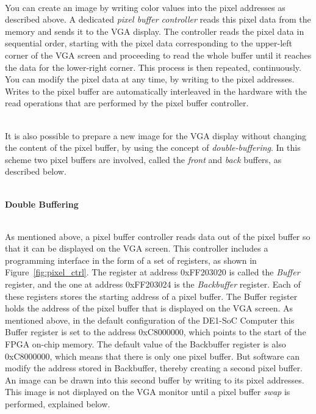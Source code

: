 \documentclass[epsfig,10pt,fullpage]{article}
\begin{document}
~\\
\noindent
You can create an image by writing color values into the pixel addresses as described
above. A dedicated {\it pixel buffer controller} reads this pixel data from the memory and 
sends it to the VGA display.  The controller reads the pixel data in sequential order, 
starting with the pixel data corresponding to the upper-left corner of the VGA screen and 
proceeding to read the whole buffer until it reaches the data for the lower-right corner. This 
process is then repeated, continuously.  You can modify the pixel data at any time, by writing 
to the pixel addresses. Writes to the pixel buffer are automatically interleaved in the 
hardware with the read operations that are performed by the pixel buffer controller. 

~\\
\noindent
It is also possible to prepare a new image for the VGA display without changing the content 
of the pixel buffer, by using the concept of {\it double-buffering}.  In this scheme two 
pixel buffers are involved, called the {\it front} and {\it back} buffers, as described below.

~\\
\noindent
{\bf Double Buffering}
\label{sec:double_buffer}

~\\
\noindent
As mentioned above, a pixel buffer controller reads data out of the pixel buffer so that it 
can be displayed on the VGA screen. This controller 
includes a programming interface in the form of a set of registers, as
shown in Figure~\ref{fig:pixel_ctrl}. The register at address {\sf 0xFF203020} is called 
the {\it Buffer} register, and the one at address {\sf 0xFF203024} is the 
{\it Backbuffer} register. Each of these registers stores the starting address of a pixel 
buffer. The Buffer register holds the address of the pixel buffer that is displayed on
the VGA screen. As mentioned above, in the default configuration of the DE1-SoC Computer this 
Buffer register is set to the address {\sf 0xC8000000}, which points to the start of the FPGA 
on-chip memory. The default value of the Backbuffer register is also {\sf 0xC8000000},
which means that there is only one pixel buffer. But software can modify the address
stored in Backbuffer, thereby creating a second pixel buffer. An image can be
drawn into this second buffer by writing to its pixel addresses. This image is not displayed 
on the VGA monitor until a pixel buffer {\it swap} is performed, explained below.
\end{document}

